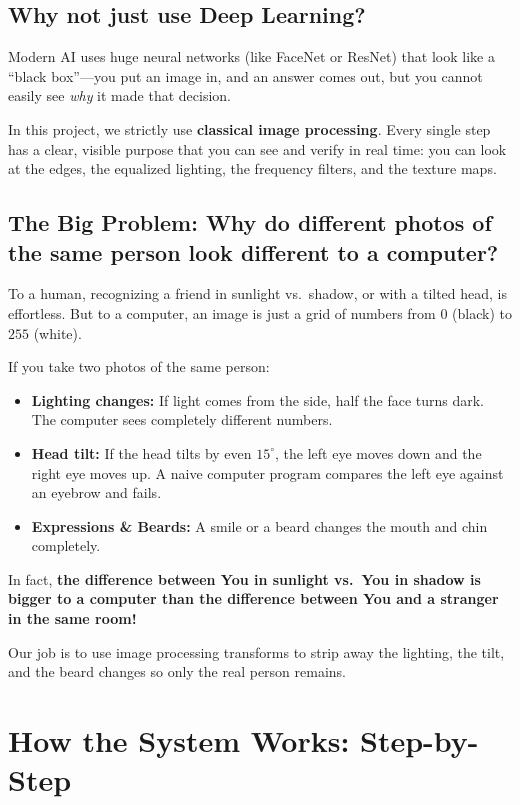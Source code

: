 \documentclass[11pt,a4paper]{article}
\begin{document}
\subsection{Why not just use Deep Learning?}
Modern AI uses huge neural networks (like FaceNet or ResNet) that look like a ``black box''—you put an image in, and an answer comes out, but you cannot easily see \emph{why} it made that decision. 

In this project, we strictly use \textbf{classical image processing}. Every single step has a clear, visible purpose that you can see and verify in real time: you can look at the edges, the equalized lighting, the frequency filters, and the texture maps.

\subsection{The Big Problem: Why do different photos of the same person look different to a computer?}
To a human, recognizing a friend in sunlight vs.\ shadow, or with a tilted head, is effortless. But to a computer, an image is just a grid of numbers from $0$ (black) to $255$ (white).

If you take two photos of the same person:
\begin{itemize}[leftmargin=1.5em]
    \item \textbf{Lighting changes:} If light comes from the side, half the face turns dark. The computer sees completely different numbers.
    \item \textbf{Head tilt:} If the head tilts by even $15^\circ$, the left eye moves down and the right eye moves up. A naive computer program compares the left eye against an eyebrow and fails.
    \item \textbf{Expressions \& Beards:} A smile or a beard changes the mouth and chin completely.
\end{itemize}

In fact, \textbf{the difference between You in sunlight vs.\ You in shadow is bigger to a computer than the difference between You and a stranger in the same room!}

Our job is to use image processing transforms to strip away the lighting, the tilt, and the beard changes so only the real person remains.

\section{How the System Works: Step-by-Step}
\end{document}
